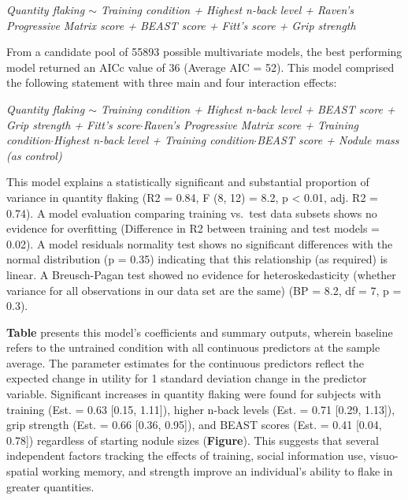 \documentclass[smallextended]{svjour3}       %
\begin{document}
\emph{Quantity flaking \(\sim\) Training condition + Highest n-back
level + Raven's Progressive Matrix score + BEAST score + Fitt's score +
Grip strength}

From a candidate pool of 55893 possible multivariate models, the best
performing model returned an AICc value of 36 (Average AIC = 52). This
model comprised the following statement with three main and four
interaction effects:

\emph{Quantity flaking \(\sim\) Training condition + Highest n-back
level + BEAST score + Grip strength + Fitt's score\(\cdot\)Raven's
Progressive Matrix score + Training condition\(\cdot\)Highest n-back
level + Training condition\(\cdot\)BEAST score + Nodule mass (as
control)}

This model explains a statistically significant and substantial
proportion of variance in quantity flaking (R2 = 0.84, F (8, 12) = 8.2,
p \textless{} 0.01, adj. R2 = 0.74). A model evaluation comparing
training vs.~test data subsets shows no evidence for overfitting
(Difference in R2 between training and test models = 0.02). A model
residuals normality test shows no significant differences with the
normal distribution (p = 0.35) indicating that this relationship (as
required) is linear. A Breusch-Pagan test showed no evidence for
heteroskedasticity (whether variance for all observations in our data
set are the same) (BP = 8.2, df = 7, p = 0.3).

\hfill\break
\textbf{Table} presents this model's coefficients and summary outputs,
wherein baseline refers to the untrained condition with all continuous
predictors at the sample average. The parameter estimates for the
continuous predictors reflect the expected change in utility for 1
standard deviation change in the predictor variable. Significant
increases in quantity flaking were found for subjects with training
(Est. = 0.63 {[}0.15, 1.11{]}), higher n-back levels (Est. = 0.71
{[}0.29, 1.13{]}), grip strength (Est. = 0.66 {[}0.36, 0.95{]}), and
BEAST scores (Est. = 0.41 {[}0.04, 0.78{]}) regardless of starting
nodule sizes (\textbf{Figure}). This suggests that several independent
factors tracking the effects of training, social information use,
visuo-spatial working memory, and strength improve an individual's
ability to flake in greater quantities.
\end{document}
